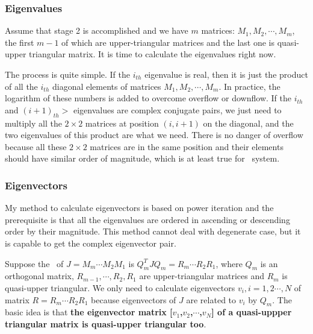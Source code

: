 	\subsubsection{Eigenvalues}
		Assume that stage 2 is accomplished and we have $m$ matrices: $M_{1},M_{2},\cdots,M_{m}$,
		the first $m-1$ of which are upper-triangular matrices and the last one is quasi-upper triangular matrix.
		It is time to calculate the eigenvalues right now.

		The process is quite simple. If the $i_{th}$ eigenvalue is real, then it is just the product of all the $i_{th}$
		diagonal elements of matrices $M_{1},M_{2},\cdots,M_{m}$. In practice, the logarithm of these numbers is added
		to overcome overflow or downflow. If the $i_{th}$ and $(i+1)_{th}>$ eigenvalues are complex conjugate pairs,
		we just need to multiply all the $2\times 2$ matrices at position $(i,i+1)$ on the diagonal, and the two
		eigenvalues of this product are what we need. There is no danger of overflow because all these $2\times 2$
		matrices are in the same position and their elements should have similar order of magnitude, which is at least
		true for \KS\ system.

	\subsubsection{Eigenvectors}
		My method to calculate eigenvectors is based on power iteration and the prerequisite is that all the eigenvalues
		are ordered in ascending or descending order by their magnitude. This method cannot deal with degenerate case, but
		it is capable to get the complex eigenvector pair.

		Suppose the \psd\ of $J=M_{m}\cdots M_{2}M_{1}$ is $Q^{T}_{m}JQ_{m}=R_{m}\cdots R_{2}R_{1}$, where $Q_{m}$ is an
		orthogonal matrix, $R_{m-1},\cdots, R_{2},R_{1}$ are upper-triangular matrices and $R_{m}$ is quasi-upper triangular.
		We only need to calculate eigenvectors $v_{i}, i=1,2\cdots, N$ of matrix $R=R_{m}\cdots R_{2}R_{1}$
		because eigenvectors of $J$ are related to $v_{i}$ by $Q_{m}$. The basic idea is that \textbf{the eigenvector matrix
		[$v_{1}$,$v_{2}$,$\cdots$,$v_{N}$] of a quasi-uppper triangular matrix is quasi-upper triangular too}.
		
